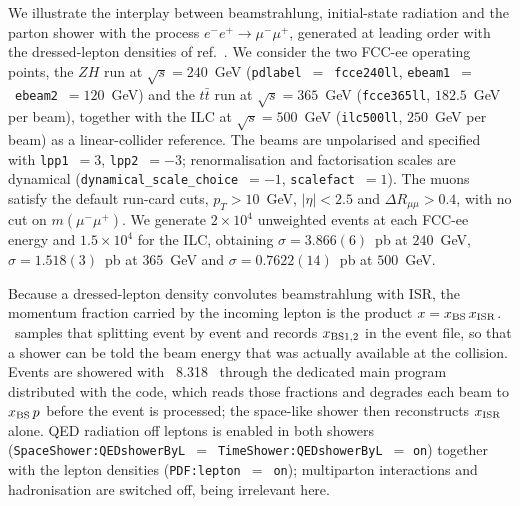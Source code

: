 
We illustrate the interplay between beamstrahlung, initial-state radiation
and the parton shower with the process $e^-e^+\to\mu^-\mu^+$, generated at
leading order with the dressed-lepton densities of
ref.~\cite{Frixione:2021zdp}.  We consider the two FCC-ee operating points,
the $ZH$ run at $\sqrt{s}=240$~GeV (\texttt{pdlabel}~$=$~\texttt{fcce240ll},
\texttt{ebeam1}~$=$~\texttt{ebeam2}~$=120$~GeV) and the $t\bar t$ run at
$\sqrt{s}=365$~GeV (\texttt{fcce365ll}, $182.5$~GeV per beam), together
with the ILC at $\sqrt{s}=500$~GeV (\texttt{ilc500ll}, $250$~GeV per beam)
as a linear-collider reference.  The beams
are unpolarised and specified with \texttt{lpp1}~$=3$, \texttt{lpp2}~$=-3$;
renormalisation and factorisation scales are dynamical
(\texttt{dynamical\_scale\_choice}~$=-1$, \texttt{scalefact}~$=1$).  The
muons satisfy the default run-card cuts, $p_T>10$~GeV, $|\eta|<2.5$ and
$\Delta R_{\mu\mu}>0.4$, with no cut on $m(\mu^-\mu^+)$.  We generate
$2\times10^4$ unweighted events at each FCC-ee energy and $1.5\times10^4$
for the ILC, obtaining $\sigma=3.866(6)$~pb at $240$~GeV,
$\sigma=1.518(3)$~pb at $365$~GeV and $\sigma=0.7622(14)$~pb at $500$~GeV.

Because a dressed-lepton density convolutes beamstrahlung with ISR, the
momentum fraction carried by the incoming lepton is the product
$x=x_{\rm BS}\,x_{\rm ISR}$.  \MGvii\ samples that splitting event by event
and records $x_{\rm BS1,2}$ in the event file, so that a shower can be told
the beam energy that was actually available at the collision.  Events are
showered with \PYTHIA~8.318~\cite{Bierlich:2022pfr} through the dedicated
main program distributed with the code, which reads those fractions and
degrades each beam to $x_{\rm BS}\,p$ before the event is processed; the
space-like shower then reconstructs $x_{\rm ISR}$ alone.  QED radiation off
leptons is enabled in both showers
(\texttt{SpaceShower:QEDshowerByL}~$=$~\texttt{TimeShower:QEDshowerByL}~$=$
\texttt{on}) together with the lepton densities
(\texttt{PDF:lepton}~$=$~\texttt{on}); multiparton interactions and
hadronisation are switched off, being irrelevant here.

